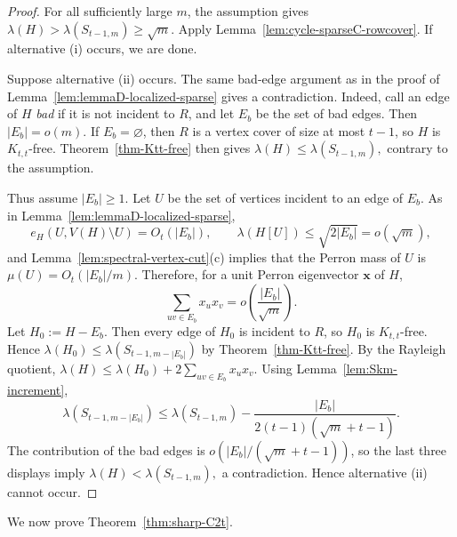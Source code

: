 \documentclass[10pt,a4paper]{amsart}
\begin{document}
\begin{proof}
For all sufficiently large \(m\), the assumption gives $\lambda(H)>\lambda(S_{t-1,m})\ge\sqrt m.$
Apply Lemma~\ref{lem:cycle-sparseC-rowcover}.  If alternative
\textup{(i)} occurs, we are done.

Suppose alternative \textup{(ii)} occurs.  The same bad-edge argument as
in the proof of Lemma~\ref{lem:lemmaD-localized-sparse} gives a
contradiction.  Indeed, call an edge of \(H\) \emph{bad} if it is not
incident to \(R\), and let \(E_b\) be the set of bad edges.  Then
$|E_b|=o(m).$
If \(E_b=\varnothing\), then \(R\) is a vertex cover of size at most
\(t-1\), so \(H\) is \(K_{t,t}\)-free.  Theorem~\ref{thm-Ktt-free}
then gives $\lambda(H)\le\lambda(S_{t-1,m}),$
contrary to the assumption.

Thus assume \(|E_b|\ge1\).  Let \(U\) be the set of vertices incident
to an edge of \(E_b\).  As in Lemma~\ref{lem:lemmaD-localized-sparse},
\[
        e_H(U,V(H)\setminus U)=O_t(|E_b|),
        \qquad
        \lambda(H[U])\le \sqrt{2|E_b|}=o(\sqrt m),
\]
and Lemma~\ref{lem:spectral-vertex-cut}\textup{(c)} implies that the
Perron mass of \(U\) is
$        \mu(U)=O_t(|E_b|/m).$
Therefore, for a unit Perron eigenvector \(\bm{x}\) of \(H\),
\[
        \sum_{uv\in E_b}x_ux_v
        =
        o\left(\frac{|E_b|}{\sqrt m}\right).
\]
Let \(H_0:=H-E_b\).  Then every edge of \(H_0\) is incident to \(R\), so
\(H_0\) is \(K_{t,t}\)-free.  Hence
$\lambda(H_0)\le \lambda(S_{t-1,m-|E_b|})$
by Theorem~\ref{thm-Ktt-free}.  By the Rayleigh quotient,
$\lambda(H)
        \le
        \lambda(H_0)+2\sum_{uv\in E_b}x_ux_v.$
Using Lemma~\ref{lem:Skm-increment},
\[
        \lambda(S_{t-1,m-|E_b|})
        \le
        \lambda(S_{t-1,m})
        -
        \frac{|E_b|}{2(t-1)(\sqrt m+t-1)}.
\]
The contribution of the bad edges is
\(o(|E_b|/(\sqrt m+t-1))\), so the last three displays imply $\lambda(H)<\lambda(S_{t-1,m}),$
a contradiction.  Hence alternative \textup{(ii)} cannot occur.
\end{proof}

We now prove Theorem~\ref{thm:sharp-C2t}.
\end{document}
